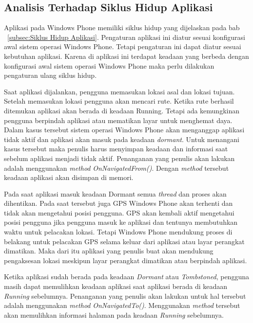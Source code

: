 \subsection{Analisis Terhadap Siklus Hidup Aplikasi}
\label{lab:Analisis Terhadap Siklus Hidup Aplikasi}
\hspace{0.5cm} Aplikasi pada Windows Phone memiliki siklus hidup yang dijelaskan pada bab ~\ref{subsec:Siklus Hidup Aplikasi}. Pengaturan aplikasi ini diatur sesuai konfigurasi awal sistem operasi Windows Phone. Tetapi pengaturan ini dapat diatur sesuai kebutuhan aplikasi. Karena di aplikasi ini terdapat keadaan yang berbeda dengan konfigurasi awal sistem operasi Windows Phone maka perlu dilakukan pengaturan ulang siklus hidup.

Saat aplikasi dijalankan, pengguna memasukan lokasi asal dan lokasi tujuan. Setelah memasukan lokasi pengguna akan mencari rute. Ketika rute berhasil ditemukan aplikasi akan berada di keadaan Running. Tetapi ada kemungkinan pengguna berpindah aplikasi atau mematikan layar untuk menghemat daya. Dalam kasus tersebut sistem operasi Windows Phone akan menganggap aplikasi tidak aktif dan aplikasi akan masuk pada keadaan \textit{dormant}. Untuk menangani kasus tersebut maka penulis harus menyimpan keadaan dan informasi saat sebelum aplikasi menjadi tidak aktif. Penanganan yang penulis akan lakukan adalah menggunakan \textit{method} \textit{OnNavigatedFrom()}. Dengan \textit{method} tersebut keadaan aplikasi akan disimpan di memori.

Pada saat aplikasi masuk keadaan Dormant semua \textit{thread} dan proses akan dihentikan. Pada saat tersebut juga GPS Windows Phone akan terhenti dan tidak akan mengetahui posisi pengguna. GPS akan kembali aktif mengetahui posisi pengguna jika pengguna masuk ke aplikasi dan tentunya membutuhkan waktu untuk pelacakan lokasi. Tetapi Windows Phone mendukung proses di belakang untuk pelacakan GPS selama keluar dari aplikasi atau layar perangkat dimatikan. Maka dari itu aplikasi yang penulis buat akan mendukung pengaksesan lokasi meskipun layar perangkat dimatikan atau berpindah aplikasi. 

Ketika aplikasi sudah berada pada keadaan \textit{Dormant} atau \textit{Tombstoned}, pengguna masih dapat memulihkan keadaan aplikasi saat aplikasi berada di keadaan \textit{Running} sebelumnya. Penanganan yang penulis akan lakukan untuk hal tersebut adalah menggunakan \textit{method} \textit{OnNavigatedTo()}. Menggunakan \textit{method} tersebut akan memulihkan informasi halaman pada keadaan \textit{Running} sebelumnya.

